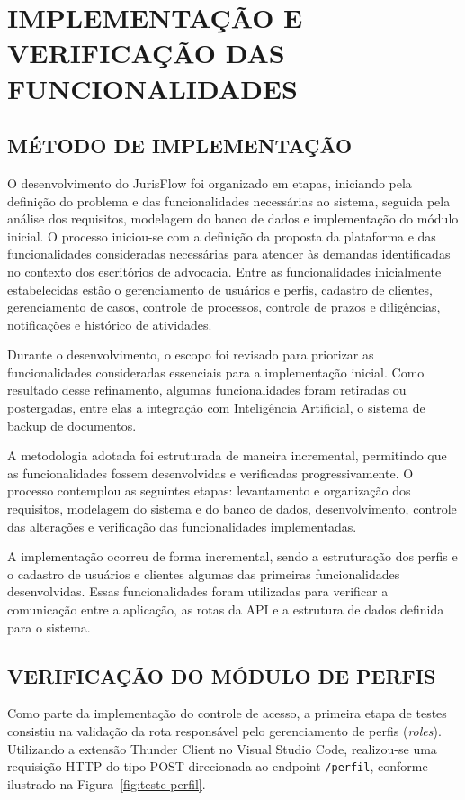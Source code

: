 \section{IMPLEMENTAÇÃO E VERIFICAÇÃO DAS FUNCIONALIDADES}

\subsection{MÉTODO DE IMPLEMENTAÇÃO}

O desenvolvimento do JurisFlow foi organizado em etapas, iniciando pela definição
do problema e das funcionalidades necessárias ao sistema, seguida pela análise dos
requisitos, modelagem do banco de dados e implementação do módulo inicial. O
processo iniciou-se com a definição da proposta da plataforma e das funcionalidades
consideradas necessárias para atender às demandas identificadas no contexto dos
escritórios de advocacia. Entre as funcionalidades inicialmente estabelecidas estão
o gerenciamento de usuários e perfis, cadastro de clientes, gerenciamento de casos, controle de processos, controle de prazos e diligências, notificações e
histórico de atividades.

Durante o desenvolvimento, o escopo foi revisado para priorizar as funcionalidades
consideradas essenciais para a implementação inicial. Como resultado desse
refinamento, algumas funcionalidades foram retiradas ou postergadas, entre elas a
integração com Inteligência Artificial, o sistema de backup de documentos.

A metodologia adotada foi estruturada de maneira incremental, permitindo que as
funcionalidades fossem desenvolvidas e verificadas progressivamente. O processo
contemplou as seguintes etapas: levantamento e organização dos requisitos,
modelagem do sistema e do banco de dados, desenvolvimento, controle das alterações
e verificação das funcionalidades implementadas.

A implementação ocorreu de forma incremental, sendo a estruturação dos perfis e o
cadastro de usuários e clientes algumas das primeiras funcionalidades desenvolvidas.
Essas funcionalidades foram utilizadas para verificar a comunicação entre a
aplicação, as rotas da API e a estrutura de dados definida para o sistema.

\subsection{VERIFICAÇÃO DO MÓDULO DE PERFIS}

Como parte da implementação do controle de acesso, a primeira etapa de testes
consistiu na validação da rota responsável pelo gerenciamento de perfis
(\textit{roles}). Utilizando a extensão Thunder Client no Visual Studio Code,
realizou-se uma requisição HTTP do tipo POST direcionada ao endpoint
\texttt{/perfil}, conforme ilustrado na Figura~\ref{fig:teste-perfil}.

